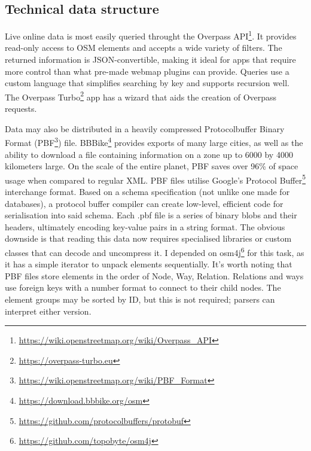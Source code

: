 \subsection{Technical data structure}

Live online data is most easily queried throught the Overpass API\footnote{\url{https://wiki.openstreetmap.org/wiki/Overpass_API}}. It provides read-only access to OSM elements and accepts a wide variety of filters. The returned information is JSON-convertible, making it ideal for apps that require more control than what pre-made webmap plugins can provide. Queries use a custom language that simplifies searching by key and supports recursion well. The Overpass Turbo\footnote{\url{https://overpass-turbo.eu}} app has a wizard that aids the creation of Overpass requests.

Data may also be distributed in a heavily compressed Protocolbuffer Binary Format (PBF\footnote{\url{https://wiki.openstreetmap.org/wiki/PBF_Format}}) file. BBBike\footnote{\url{https://download.bbbike.org/osm}} provides exports of many large cities, as well as the ability to download a file containing information on a zone up to 6000 by 4000 kilometers large. On the scale of the entire planet, PBF saves over 96\% of space usage when compared to regular XML. PBF files utilise Google's Protocol Buffer\footnote{\url{https://github.com/protocolbuffers/protobuf}} interchange format. Based on a schema specification (not unlike one made for databases), a protocol buffer compiler can create low-level, efficient code for serialisation into said schema. Each .pbf file is a series of binary blobs and their headers, ultimately encoding key-value pairs in a string format. The obvious downside is that reading this data now requires specialised libraries or custom classes that can decode and uncompress it. I depended on osm4j\footnote{\url{https://github.com/topobyte/osm4j}} for this task, as it has a simple iterator to unpack elements sequentially.
It's worth noting that PBF files store elements in the order of Node, Way, Relation. Relations and ways use foreign keys with a number format to connect to their child nodes. The element groups may be sorted by ID, but this is not required; parsers can interpret either version.